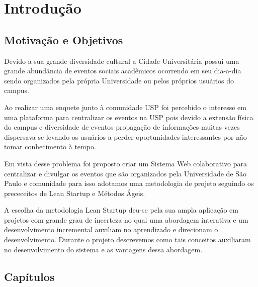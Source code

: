 \chapter{Introdução}
\label{cap:introducao}
\section{Motivação e Objetivos}

\par Devido a sua grande diversidade cultural a Cidade Universitária possui uma grande abundância de eventos sociais acadêmicos ocorrendo em seu dia-a-dia sendo organizados pela própria Universidade ou pelos próprios usuários do campus.

\par Ao realizar uma enquete junto à comunidade USP foi percebido o interesse em uma plataforma para centralizar os eventos na USP pois devido a extensão física do campus e diversidade de eventos propagação de informações muitas vezes dispersava-se levando os usuários a perder oportunidades interessantes por não tomar conhecimento à tempo.

\par Em vista desse problema foi proposto criar um Sistema Web colaborativo para centralizar e divulgar os eventos que são organizados pela Universidade de São Paulo e comunidade para isso adotamos uma metodologia de projeto seguindo os prececeitos de Lean Startup e Métodos Ágeis.

\par A escolha da metodologia Lean Startup deu-se pela sua ampla aplicação em projetos com grande grau de incerteza no qual uma abordagem interativa e um desenvolvimento incremental auxiliam no aprendizado e direcionam o desenvolvimento. Durante o projeto descrevemos como tais conceitos auxiliaram no desenvolvimento do sistema e as vantagens dessa abordagem.

\section{Capítulos}
